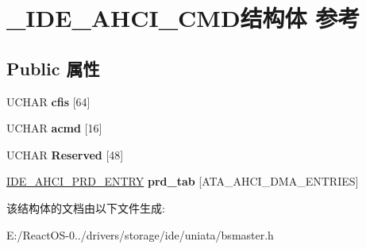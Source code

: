 \hypertarget{struct___i_d_e___a_h_c_i___c_m_d}{}\section{\+\_\+\+I\+D\+E\+\_\+\+A\+H\+C\+I\+\_\+\+C\+M\+D结构体 参考}
\label{struct___i_d_e___a_h_c_i___c_m_d}
\subsection*{Public 属性}
\begin{DoxyCompactItemize}
\item 
\mbox{\label{struct___i_d_e___a_h_c_i___c_m_d_a14360c5baaef944e7d387e4999fa9efd}} 
U\+C\+H\+AR {\bfseries cfis} \mbox{[}64\mbox{]}
\item 
\mbox{\label{struct___i_d_e___a_h_c_i___c_m_d_af778cef4fa63c3f07b3ba12accb73ebd}} 
U\+C\+H\+AR {\bfseries acmd} \mbox{[}16\mbox{]}
\item 
\mbox{\label{struct___i_d_e___a_h_c_i___c_m_d_a7d9d44559addbd83556a12e167f5bab4}} 
U\+C\+H\+AR {\bfseries Reserved} \mbox{[}48\mbox{]}
\item 
\mbox{\label{struct___i_d_e___a_h_c_i___c_m_d_a476dac6a98a47b94ac292aba9d9e848f}} 
\hyperlink{struct___i_d_e___a_h_c_i___p_r_d___e_n_t_r_y}{I\+D\+E\+\_\+\+A\+H\+C\+I\+\_\+\+P\+R\+D\+\_\+\+E\+N\+T\+RY} {\bfseries prd\+\_\+tab} \mbox{[}A\+T\+A\+\_\+\+A\+H\+C\+I\+\_\+\+D\+M\+A\+\_\+\+E\+N\+T\+R\+I\+ES\mbox{]}
\end{DoxyCompactItemize}


该结构体的文档由以下文件生成\+:\begin{DoxyCompactItemize}
\item 
E\+:/\+React\+O\+S-\/0../drivers/storage/ide/uniata/bsmaster.\+h\end{DoxyCompactItemize}
